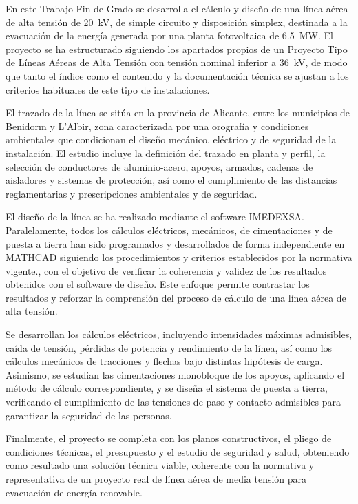 En este Trabajo Fin de Grado se desarrolla el cálculo y diseño de una línea aérea de alta tensión de \SI{20}{\kilo\volt}, de simple circuito y disposición simplex, destinada a la evacuación de la energía generada por una planta fotovoltaica de \SI{6.5}{\mega\watt}. El proyecto se ha estructurado siguiendo los apartados propios de un Proyecto Tipo de Líneas Aéreas de Alta Tensión con tensión nominal inferior a \SI{36}{\kilo\volt}, de modo que tanto el índice como el contenido y la documentación técnica se ajustan a los criterios habituales de este tipo de instalaciones.

El trazado de la línea se sitúa en la provincia de Alicante, entre los municipios de Benidorm y L’Albir, zona caracterizada por una orografía y condiciones ambientales que condicionan el diseño mecánico, eléctrico y de seguridad de la instalación. El estudio incluye la definición del trazado en planta y perfil, la selección de conductores de aluminio-acero, apoyos, armados, cadenas de aisladores y sistemas de protección, así como el cumplimiento de las distancias reglamentarias y prescripciones ambientales y de seguridad.

El diseño de la línea se ha realizado mediante el software IMEDEXSA. Paralelamente, todos los cálculos eléctricos, mecánicos, de cimentaciones y de puesta a tierra han sido programados y desarrollados de forma independiente en MATHCAD siguiendo los procedimientos y criterios establecidos por la normativa vigente., con el objetivo de verificar la coherencia y validez de los resultados obtenidos con el software de diseño. Este enfoque permite contrastar los resultados y reforzar la comprensión del proceso de cálculo de una línea aérea de alta tensión.

Se desarrollan los cálculos eléctricos, incluyendo intensidades máximas admisibles, caída de tensión, pérdidas de potencia y rendimiento de la línea, así como los cálculos mecánicos de tracciones y flechas bajo distintas hipótesis de carga. Asimismo, se estudian las cimentaciones monobloque de los apoyos, aplicando el método de cálculo correspondiente, y se diseña el sistema de puesta a tierra, verificando el cumplimiento de las tensiones de paso y contacto admisibles para garantizar la seguridad de las personas.

Finalmente, el proyecto se completa con los planos constructivos, el pliego de condiciones técnicas, el presupuesto y el estudio de seguridad y salud, obteniendo como resultado una solución técnica viable, coherente con la normativa y representativa de un proyecto real de línea aérea de media tensión para evacuación de energía renovable.

